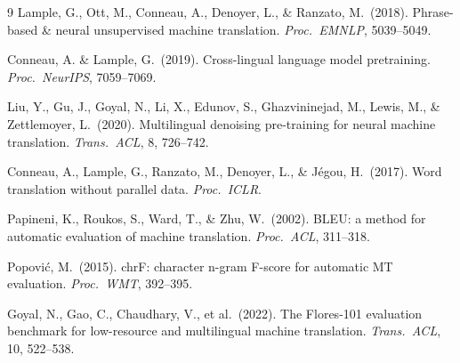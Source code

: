 \documentclass[runningheads]{llncs}
\begin{document}
\begin{thebibliography}{9}
Lample, G., Ott, M., Conneau, A., Denoyer, L., \& Ranzato, M.~(2018).
Phrase-based \& neural unsupervised machine translation.
\textit{Proc.\ EMNLP}, 5039--5049.

Conneau, A. \& Lample, G.~(2019).
Cross-lingual language model pretraining.
\textit{Proc.\ NeurIPS}, 7059--7069.

Liu, Y., Gu, J., Goyal, N., Li, X., Edunov, S., Ghazvininejad, M., Lewis, M., \& Zettlemoyer, L.~(2020).
Multilingual denoising pre-training for neural machine translation.
\textit{Trans.\ ACL}, 8, 726--742.

Conneau, A., Lample, G., Ranzato, M., Denoyer, L., \& J\'{e}gou, H.~(2017).
Word translation without parallel data.
\textit{Proc.\ ICLR}.

Papineni, K., Roukos, S., Ward, T., \& Zhu, W.~(2002).
BLEU: a method for automatic evaluation of machine translation.
\textit{Proc.\ ACL}, 311--318.

Popovi\'{c}, M.~(2015).
chrF: character n-gram F-score for automatic MT evaluation.
\textit{Proc.\ WMT}, 392--395.

Goyal, N., Gao, C., Chaudhary, V., et al.~(2022).
The Flores-101 evaluation benchmark for low-resource and multilingual machine translation.
\textit{Trans.\ ACL}, 10, 522--538.
\end{thebibliography}
\end{document}
